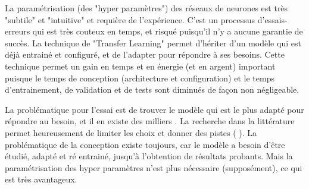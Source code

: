 \par La paramétrisation (des "hyper paramètres") des réseaux de neurones est très "subtile" et "intuitive" et requière de l'expérience. C'est un processus d'essais-erreurs qui est très couteux en temps, et risqué puisqu'il n'y a aucune garantie de succès. La technique de "Transfer Learning" permet d'hériter d'un modèle qui est déjà entrainé et configuré, et de l'adapter pour répondre à ses besoins. Cette technique permet un gain en temps et en énergie (et en argent) important puisque le temps de conception (architecture et configuration) et le temps d'entrainement, de validation et de tests sont diminués de façon non négligeable.
\begin{comment}
Par exemple le modèle "VGG" prend 2-3 semaines d'entrainement \cite{simonyan_very_2015} avec 4 GPU Titan Black (NVIDIA), coutant 1,200\$US (Amazon.com) chacun (pour un total de 4,800\$US, et cela juste pour les GPUs, qui ne sont qu'un des éléments de l'infrastructure nécessaire). Étant donné que de multiples tentatives sont nécessaires (cycles essai-erreur), la stratégie est d'entrainer plusieurs modèles en parallèle afin d'accélérer le développement, ce qui implique un cout élevé en infrastructure.
\end{comment}
La problématique pour l'essai est de trouver le modèle qui est le plus adapté pour répondre au besoin, et il en existe des milliers \cite{koh_model_2018}. La recherche dans la littérature permet heureusement de limiter les choix et donner des pistes (\cite{zheng_real-time_2020} \cite{nguyen_mavnet_2019} \cite{nvidia_jetson_2019-1}). La problématique de la conception existe toujours, car le modèle a besoin d'être étudié, adapté et ré entrainé, jusqu'à l'obtention de résultats probants. Mais la paramétrisation des hyper paramètres n'est plus nécessaire (supposément), ce qui est très avantageux.
